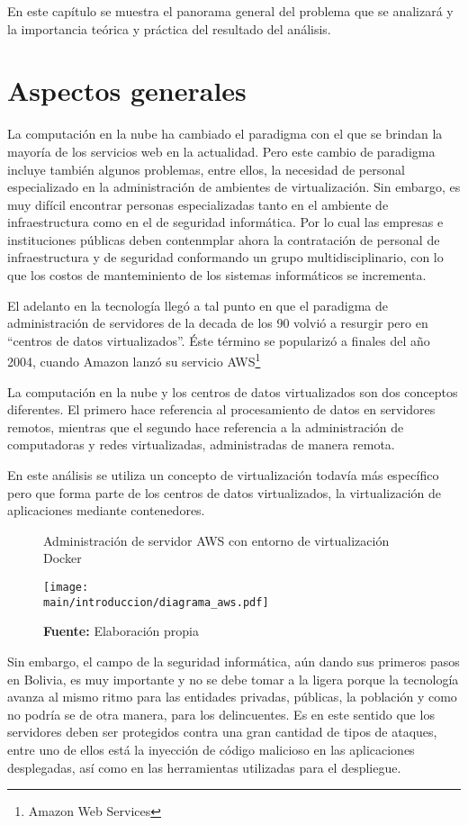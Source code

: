 \documentclass[../main/main.tex]{subfiles}
\begin{document}
\espacio

  En este capítulo se muestra el panorama general del problema que se analizará y la importancia teórica y práctica del resultado del análisis.

  \section{Aspectos generales}

  La computación en la nube ha cambiado el paradigma con el que se brindan la mayoría de los servicios web en la actualidad. Pero este cambio de paradigma incluye también algunos problemas, entre ellos, la necesidad de personal especializado en la administración de ambientes de virtualización. Sin embargo, es muy difícil encontrar personas especializadas tanto en el ambiente de infraestructura como en el de seguridad informática. Por lo cual las empresas e instituciones públicas deben contenmplar ahora la contratación de personal de infraestructura y de seguridad conformando un grupo multidisciplinario, con lo que los costos de manteminiento de los sistemas informáticos se incrementa.

  El adelanto en la tecnología llegó a tal punto en que el paradigma de administración de servidores de la decada de los 90 volvió a resurgir pero en ``centros de datos virtualizados''. Éste término se popularizó a finales del año 2004, cuando Amazon lanzó su servicio AWS\footnote{Amazon Web Services}

  La computación en la nube y los centros de datos virtualizados son dos conceptos diferentes. El primero hace referencia al procesamiento de datos en servidores remotos, mientras que el segundo hace referencia a la administración de computadoras y redes virtualizadas, administradas de manera remota.

  En este análisis se utiliza un concepto de virtualización todavía más específico pero que forma parte de los centros de datos virtualizados, la virtualización de aplicaciones mediante contenedores.

  \begin{figure}[ht]
    \centering
    \caption{Administración de servidor AWS con entorno de virtualización Docker}
    \texttt{[image: \\main/introduccion/diagrama\_aws.pdf]}
    \caption*{\textbf{Fuente:} Elaboración propia}
  \end{figure}

  Sin embargo, el campo de la seguridad informática, aún dando sus primeros pasos en Bolivia, es muy importante y no se debe tomar a la ligera porque la tecnología avanza al mismo ritmo para las entidades privadas, públicas, la población y como no podría se de otra manera, para los delincuentes. Es en este sentido que los servidores deben ser protegidos contra una gran cantidad de tipos de ataques, entre uno de ellos está la inyección de código malicioso en las aplicaciones desplegadas, así como en las herramientas utilizadas para el despliegue.
\end{document}

